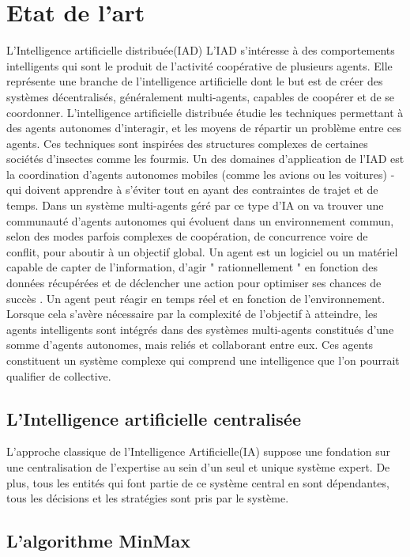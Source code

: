 \documentclass[11pt]{article} %
\begin{document}
\section{Etat de l'art}
L’Intelligence artificielle distribuée(IAD)
L’IAD s’intéresse à des comportements intelligents qui sont le produit de l’activité coopérative de plusieurs agents. Elle représente une branche de l'intelligence artificielle dont le but est de créer des systèmes décentralisés, généralement multi-agents, capables de coopérer et de se coordonner. L'intelligence artificielle distribuée étudie les techniques permettant à des agents autonomes d'interagir, et les moyens de répartir un problème entre ces agents. Ces techniques sont inspirées des structures complexes de certaines sociétés d'insectes comme les fourmis. Un des domaines d'application de l'IAD est la coordination d'agents autonomes mobiles (comme les avions ou les voitures) - qui doivent apprendre à s'éviter tout en ayant des contraintes de trajet et de temps. 
Dans un système multi-agents géré par ce type d’IA on va trouver une communauté d’agents autonomes qui évoluent dans un environnement commun, selon des modes parfois complexes de coopération, de concurrence voire de conflit, pour aboutir à un objectif global. Un agent est un logiciel ou un matériel capable de capter de l’information, d’agir " rationnellement " en fonction des données récupérées et de déclencher une action pour optimiser ses chances de succès \cite{agents}. 
Un agent peut réagir en temps réel et en fonction de l’environnement. Lorsque cela s’avère nécessaire par la complexité de l’objectif à atteindre, les agents intelligents sont intégrés dans des systèmes multi-agents constitués d’une somme d’agents autonomes, mais reliés et collaborant entre eux.  \cite{population}
Ces agents constituent un système complexe qui comprend une intelligence que l’on pourrait qualifier de collective.

\subsection{L’Intelligence artificielle centralisée}

L’approche classique de l’Intelligence Artificielle(IA) suppose une fondation sur une centralisation de l’expertise au sein d’un seul et unique système expert. De plus, tous les entités qui font partie de ce système central en sont dépendantes, tous les décisions et les stratégies sont pris par le système. \cite{IA}

\subsection{L’algorithme MinMax}
\end{document}
